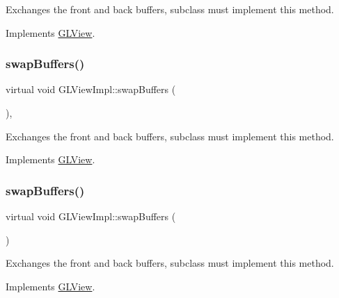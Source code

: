 Exchanges the front and back buffers, subclass must implement this method. 

Implements \hyperlink{classGLView_a8868ba73f19216f5f6c8dbcc1a7c9bb4}{G\+L\+View}.

\mbox{\label{classGLViewImpl_ab434675d26eb367ae74f9533c34d2ca7}} 
\subsubsection{\texorpdfstring{swap\+Buffers()}{swapBuffers()}\hspace{0.1cm}{\footnotesize\ttfamily [8/9]}}
{\footnotesize\ttfamily virtual void G\+L\+View\+Impl\+::swap\+Buffers (\begin{DoxyParamCaption}{ }\end{DoxyParamCaption})\hspace{0.3cm}{\ttfamily [override]}, {\ttfamily [virtual]}}

Exchanges the front and back buffers, subclass must implement this method. 

Implements \hyperlink{classGLView_a8868ba73f19216f5f6c8dbcc1a7c9bb4}{G\+L\+View}.

\mbox{\label{classGLViewImpl_afe7883d151fd7d92d19d3359dc33e8b9}} 
\subsubsection{\texorpdfstring{swap\+Buffers()}{swapBuffers()}\hspace{0.1cm}{\footnotesize\ttfamily [9/9]}}
{\footnotesize\ttfamily virtual void G\+L\+View\+Impl\+::swap\+Buffers (\begin{DoxyParamCaption}{ }\end{DoxyParamCaption})\hspace{0.3cm}{\ttfamily [virtual]}}

Exchanges the front and back buffers, subclass must implement this method. 

Implements \hyperlink{classGLView_a8868ba73f19216f5f6c8dbcc1a7c9bb4}{G\+L\+View}.

\mbox{\label{classGLViewImpl_a0d0a12b4bfa3656c9b24ca8b141f7b1e}} 
